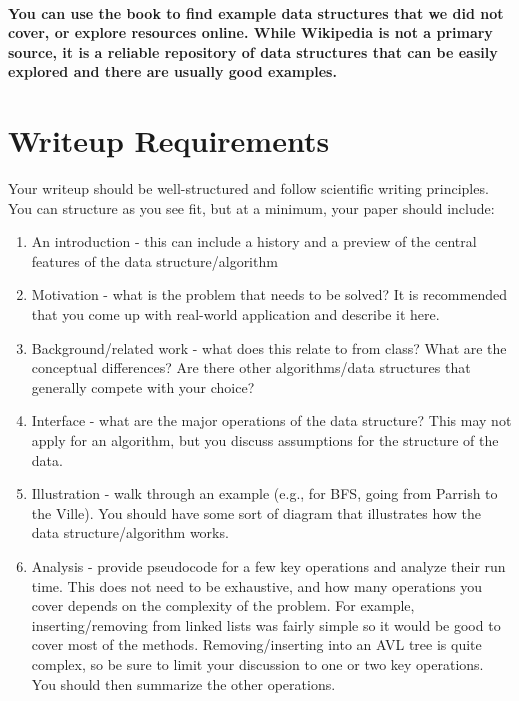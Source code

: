 \documentclass[conference]{IEEEtran}
\begin{document}
\paragraph{
You can use the book to find example data structures that we did not cover, or explore resources online. While Wikipedia is not a primary source, it is a reliable repository of data structures that can be easily explored and there are usually good examples.}




\section{Writeup Requirements}
Your writeup should be well-structured and follow scientific writing principles. You can structure as you see fit, but at a minimum, your paper should include:

\begin{enumerate}

  \item An introduction - this can include a history and a preview of the central features of the data structure/algorithm
  \item Motivation - what is the problem that needs to be solved? It is recommended that you come up with real-world application and describe it here.
  \item Background/related work - what does this relate to from class? What are the conceptual differences? Are there other algorithms/data structures that generally compete with your choice?	
  \item Interface - what are the major operations of the data structure? This may not apply for an algorithm, but you discuss assumptions for the structure of the data.
  \item Illustration - walk through an example (e.g., for BFS, going from Parrish to the Ville). You should have some sort of diagram that illustrates how the data structure/algorithm works.
  ~\cite{da} 
  \item Analysis - provide pseudocode for a few key operations and analyze their run time. This does not need to be exhaustive, and how many operations you cover depends on the complexity of the problem. For example, inserting/removing from linked lists was fairly simple so it would be good to cover most of the methods. Removing/inserting into an AVL tree is quite complex, so be sure to limit your discussion to one or two key operations. You should then summarize the other operations.
~\cite{ds} 

\end{enumerate}
\end{document}
